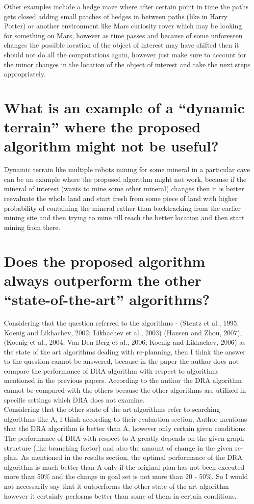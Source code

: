 \documentclass[a4paper]{article}
\begin{document}
Other examples include a hedge maze where after certain point in time the paths gets closed adding small patches of hedges in between paths (like in Harry Potter) or another environment like Mars curiosity rover which may be looking for something on Mars, however as time passes and because of some unforeseen changes the possible location of the object of interest may have shifted then it should not do all the computations again, however just make sure to account for the minor changes in the location of the object of interest and take the next steps appropriately.

\section{What is an example of a “dynamic terrain” where the proposed algorithm might not be useful?}
\label{sec:Q2}

Dynamic terrain like multiple robots mining for some mineral in a particular cave can be an example where the proposed algorithm might not work, because if the mineral of interest (wants to mine some other mineral) changes then it is better reevaluate the whole land and start fresh from some piece of land with higher probability of containing the mineral rather than backtracking from the earlier mining site and then trying to mine till reach the better location and then start mining from there.

\section{Does the proposed algorithm always outperform the other “state-of-the-art” algorithms?}
\label{sec:Q3}

Considering that the question referred to the algorithms - (Stentz et al., 1995; Koenig and Likhachev, 2002; Likhachev et al., 2003) (Hansen and Zhou, 2007), (Koenig et al., 2004; Van Den Berg et al., 2006; Koenig and Likhachev, 2006) as the state of the art algorithms dealing with re-planning, then I think the answer to the question cannot be answered, because in the paper the author does not compare the performance of DRA\text{*} algorithm with respect to algorithms mentioned in the previous papers. According to the author the DRA\text{*} algorithm cannot be compared with the others because the other algorithms are utilized in specific settings which DRA\text{*} does not examine.
\\

Considering that the other state of the art algorithms refer to searching algorithms like A\text{*}, I think according to their evaluation section, Author mentions that the DRA\text{*} algorithm is better than A\text{*}, however only certain given conditions. The performance of DRA\text{*} with respect to A\text{*} greatly depends on the given graph structure (like branching factor) and also the amount of change in the given re-plan. As mentioned in the results section, the optimal performance of the DRA\text{*} algorithm is much better than A\text{*} only if the original plan has not been executed more than 50\% and the change in goal set is not more than 20 - 50\%. So I would not necessarily say that it outperforms the other state of the art algorithm however it certainly performs better than some of them in certain conditions.
\end{document}
